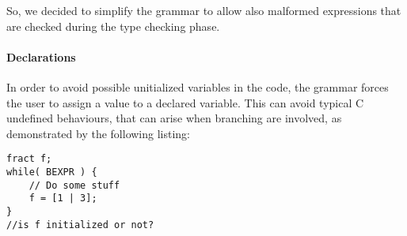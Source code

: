 So, we decided to simplify the grammar to allow also malformed expressions that
are checked during the type checking phase.


\paragraph{Declarations}

In order to avoid possible unitialized variables in the code, the grammar
forces the user to assign a value to a declared variable. This can avoid
typical C undefined behaviours, that can arise when branching are involved, as
demonstrated by the following listing:
\begin{verbatim}
fract f;
while( BEXPR ) {
    // Do some stuff
    f = [1 | 3];
}
//is f initialized or not?
\end{verbatim}
